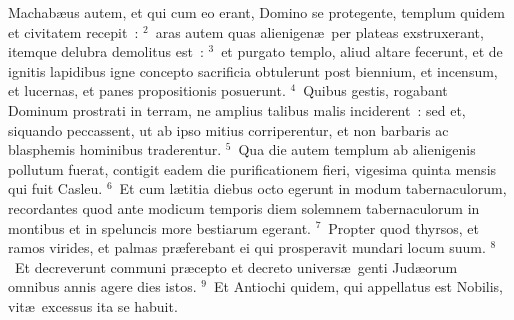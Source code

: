 \lettrine[lines=3,image=true,loversize=0.05,lraise=-0.03]{M}{}achab\ae us autem, et qui cum eo erant, Domino se protegente, templum quidem et civitatem recepit~:
${}^{2}$~aras autem quas alienigen\ae\ per plateas exstruxerant, itemque delubra demolitus est~:
${}^{3}$~et purgato templo, aliud altare fecerunt, et de ignitis lapidibus igne concepto sacrificia obtulerunt post biennium, et incensum, et lucernas, et panes propositionis posuerunt.
${}^{4}$~Quibus gestis, rogabant Dominum prostrati in terram, ne amplius talibus malis inciderent~: sed et, siquando peccassent, ut ab ipso mitius corriperentur, et non barbaris ac blasphemis hominibus traderentur.
${}^{5}$~Qua die autem templum ab alienigenis pollutum fuerat, contigit eadem die purificationem fieri, vigesima quinta mensis qui fuit Casleu.
${}^{6}$~Et cum l\ae titia diebus octo egerunt in modum tabernaculorum, recordantes quod ante modicum temporis diem solemnem tabernaculorum in montibus et in speluncis more bestiarum egerant.
${}^{7}$~Propter quod thyrsos, et ramos virides, et palmas pr\ae ferebant ei qui prosperavit mundari locum suum.
${}^{8}$~Et decreverunt communi pr\ae cepto et decreto univers\ae\ genti Jud\ae orum omnibus annis agere dies istos.
${}^{9}$~Et Antiochi quidem, qui appellatus est Nobilis, vit\ae\ excessus ita se habuit.


